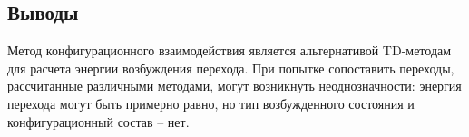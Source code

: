 \subsection{Выводы}
Метод конфигурационного взаимодействия является альтернативой TD-методам для расчета энергии возбуждения перехода. При попытке сопоставить переходы, рассчитанные различными методами, могут возникнуть неоднозначности: энергия перехода могут быть примерно равно, но тип возбужденного состояния и конфигурационный состав -- нет. 
